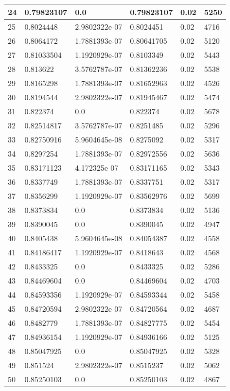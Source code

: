 \begin{longtable}{|l|l|l|l|l|l|}
24 & 0.79823107 & 0.0 & 0.79823107 & 0.02 & 5250 \\ \hline 
25 & 0.8024448 & 2.9802322e-07 & 0.8024451 & 0.02 & 4716 \\ \hline 
26 & 0.8064172 & 1.7881393e-07 & 0.80641705 & 0.02 & 5120 \\ \hline 
27 & 0.81033504 & 1.1920929e-07 & 0.8103349 & 0.02 & 5443 \\ \hline 
28 & 0.813622 & 3.5762787e-07 & 0.81362236 & 0.02 & 5538 \\ \hline 
29 & 0.8165298 & 1.7881393e-07 & 0.81652963 & 0.02 & 4526 \\ \hline 
30 & 0.8194544 & 2.9802322e-07 & 0.81945467 & 0.02 & 5474 \\ \hline 
31 & 0.822374 & 0.0 & 0.822374 & 0.02 & 5678 \\ \hline 
32 & 0.82514817 & 3.5762787e-07 & 0.8251485 & 0.02 & 5296 \\ \hline 
33 & 0.82750916 & 5.9604645e-08 & 0.8275092 & 0.02 & 5317 \\ \hline 
34 & 0.8297254 & 1.7881393e-07 & 0.82972556 & 0.02 & 5636 \\ \hline 
35 & 0.83171123 & 4.172325e-07 & 0.83171165 & 0.02 & 5343 \\ \hline 
36 & 0.8337749 & 1.7881393e-07 & 0.8337751 & 0.02 & 5317 \\ \hline 
37 & 0.8356299 & 1.1920929e-07 & 0.83562976 & 0.02 & 5699 \\ \hline 
38 & 0.8373834 & 0.0 & 0.8373834 & 0.02 & 5136 \\ \hline 
39 & 0.8390045 & 0.0 & 0.8390045 & 0.02 & 4947 \\ \hline 
40 & 0.8405438 & 5.9604645e-08 & 0.84054387 & 0.02 & 4558 \\ \hline 
41 & 0.84186417 & 1.1920929e-07 & 0.8418643 & 0.02 & 4568 \\ \hline 
42 & 0.8433325 & 0.0 & 0.8433325 & 0.02 & 5286 \\ \hline 
43 & 0.84469604 & 0.0 & 0.84469604 & 0.02 & 4703 \\ \hline 
44 & 0.84593356 & 1.1920929e-07 & 0.84593344 & 0.02 & 5458 \\ \hline 
45 & 0.84720594 & 2.9802322e-07 & 0.84720564 & 0.02 & 4687 \\ \hline 
46 & 0.8482779 & 1.7881393e-07 & 0.84827775 & 0.02 & 5454 \\ \hline 
47 & 0.84936154 & 1.1920929e-07 & 0.84936166 & 0.02 & 5125 \\ \hline 
48 & 0.85047925 & 0.0 & 0.85047925 & 0.02 & 5328 \\ \hline 
49 & 0.851524 & 2.9802322e-07 & 0.8515237 & 0.02 & 5062 \\ \hline 
50 & 0.85250103 & 0.0 & 0.85250103 & 0.02 & 4867 \\ \hline 
\end{longtable}
